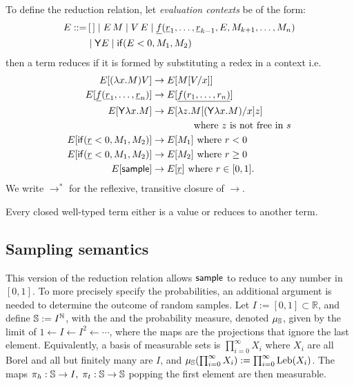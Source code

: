 To define the reduction relation, let \emph{evaluation contexts} be of the form:
\begin{align*}
  E ::= & \, [\,] \mid E \, M \mid V \, E \mid \underline{f}(\underline r_1,\dots ,\underline r_{k-1}, E, M_{k+1}, \dots, M_n) \\ & \mid \mathsf{Y} E \mid \mathsf{if}(E<0, M_1, M_2)
\end{align*}
then a term reduces if it is formed by substituting a redex in a context i.e.
\begin{align*}
  E[(\lambda x.M) V] & \to E[M[V/x]] \\
  E[\underline f (\underline r_1, \dots , \underline r_n)] & \to E[\underline{f(r_1,\dots,r_n)}] \\
  E[\mathsf{Y} \lambda x. M] & \to E[\lambda z. M[(\mathsf{Y} \lambda x. M)/x] z] \\
  & \qquad \qquad \text{ where $z$ is not free in $s$}\\
  E[\mathsf{if}(\underline r < 0, M_1, M_2)] & \to E[M_1] \text{ where }r < 0 \\
  E[\mathsf{if}(\underline r < 0, M_1, M_2)] & \to E[M_2] \text{ where }r \geq 0 \\
  E[\mathsf{sample}] & \to E[\underline r] \text{ where } r \in [0,1].
\end{align*}
We write $\to^\ast$ for the reflexive, transitive closure of $\to$.

Every closed well-typed term either is a value or reduces to another term.

\subsection{Sampling semantics}
\label{sec:sampling semantics}
This version of the reduction relation allows $\mathsf{sample}$ to reduce to any number in $[0,1]$. 
To more precisely specify the probabilities, an additional argument is needed to determine the outcome of random samples. Let $ I := [0,1] \subset \mathbb{R} $, and define ${\mathbb{S}} := I^{\mathbb{N}}$, with the  and the probability measure, denoted $\mu_{{\mathbb{S}}}$, given by the limit of $1 \gets I \gets I^2 \gets \cdots$, where the maps are the projections that ignore the last element. Equivalently, a basis of measurable sets is $\prod_{i=0}^\infty X_i$ where $X_i$ are all Borel and all but finitely many are $I$, and $\mu_{{\mathbb{S}}} (\prod_{i=0}^\infty X_i) := \prod_{i=0}^\infty \mathrm{Leb}(X_i)$.
The maps $\pi_h:{\mathbb{S}} \to I, \; \pi_t:{\mathbb{S}} \to {\mathbb{S}}$ popping the first element are then measurable.

